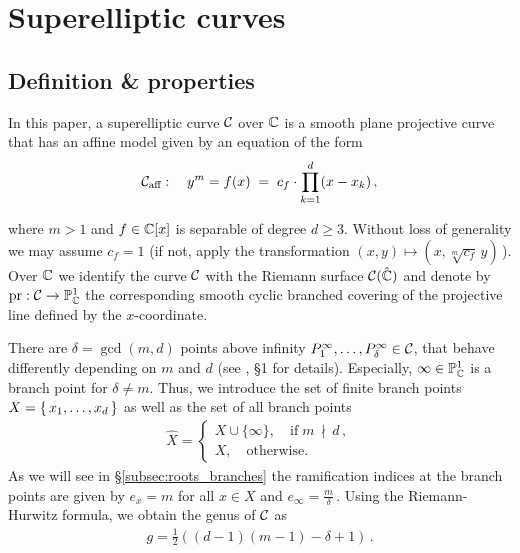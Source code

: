 \documentclass[main.tex]{subfiles}
\begin{document}
  \section{Superelliptic curves}\label{sec:se_curves}

  \subsection{Definition \& properties}
    
    \begin{defn}\label{def:se_curve}
    In this paper, a superelliptic curve $\mathcal{C}$ over $\mathbb{C}$ is a smooth plane projective curve that has an affine model given by an equation of the form 
   \begin{align}\label{eq:aff_model}
    \mathcal{C}_{\text{aff}} : \quad y^m = f(x) \;= \; c_f \cdot \prod_{k=1}^d (x-x_k)\,,
   \end{align}
   \end{defn}
   where $m > 1$ and $f \in \mathbb{C}[x]$ is separable of degree $d \ge 3$. 
   Without loss of generality we may assume $c_f = 1$ (if not, apply the transformation $(x,y) \mapsto (x,\sqrt[m]{c_f}\,y)$\,).  \abstand
   Over $\mathbb{C}$ we identify the curve $\mathcal{C}$ with the Riemann surface $\mathcal{C}(\hat{\mathbb{C}})$ and denote by $\operatorname{pr} : \mathcal{C} \rightarrow \mathbb{P}^1_{\mathbb{C}}$ the corresponding smooth cyclic branched covering of the projective line
   defined by the $x$-coordinate.
   
  There are $\delta = \gcd(m,d)$ points above infinity $P_1^{\infty},\dots,P_{\delta}^{\infty} \in \mathcal{C}$, that behave differently depending on $m$ and $d$ (see \cite{CT1996}, \S 1 for details). 
  Especially, $\infty \in \mathbb{P}^1_{\mathbb{C}}$ is a branch point for $\delta \ne m$. Thus, we introduce the set of finite branch points $X = \{ \, x_1,\dots,x_d \,\}$ as well as the set of all branch points
  \vspace{-0.3cm}
  \begin{align}\label{eq:branch_points}
         \hat{X} = \begin{cases}   X \cup \{ \infty \}, \quad \text{if} \; m \, \nmid \, d\,,\\
         X,\quad \text{otherwise.}
     \end{cases}
  \end{align} 
  As we will see in \S \ref{subsec:roots_branches} the ramification indices at the branch points are given by $e_x = m$ for all $x \in X$ and $e_{\infty} = \frac{m}{\delta}$\,. Using the
  Riemann-Hurwitz formula, we obtain the genus of $\mathcal{C}$ as
   \vspace{-0.3cm}
  \begin{align}\label{eq:genus}
    g = \frac{1}{2}( (d-1)(m-1) - \delta + 1)\,.
  \end{align}
\end{document}
